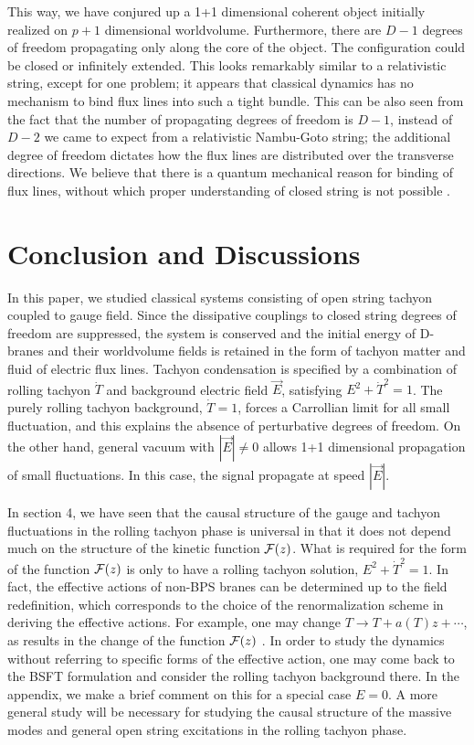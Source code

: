 \documentclass[a4paper,12pt]{article}
\begin{document}
This way, we have conjured up a 1+1 dimensional coherent object
initially realized on $p+1$ dimensional worldvolume. Furthermore,
there are $D-1$ degrees of freedom propagating only along the core 
of the object. The configuration could be closed or infinitely 
extended. This looks remarkably similar to a relativistic string,
except for one problem; it appears that classical dynamics has
no mechanism to bind flux lines into such a tight bundle. This can be
also seen from the fact that the number of propagating degrees of
freedom is  
$D-1$, instead of $D-2$ we came to expect from a relativistic Nambu-Goto 
string; the additional degree of freedom dictates how the flux lines are
distributed over the transverse directions. We believe that there is
a quantum mechanical reason for binding of flux lines, without which
proper understanding of closed string is not possible \cite{yi,conf}.

\section{Conclusion and Discussions} 

In this paper, we studied classical systems consisting of open string
tachyon 
coupled to gauge field. Since the dissipative couplings to
closed string degrees of freedom are suppressed, the system is conserved 
and the initial energy of D-branes and their worldvolume fields is
retained in the form of tachyon matter and fluid of electric flux
lines. Tachyon condensation is specified by a combination of rolling
tachyon $\dot T$ and background electric field $\vec E$, satisfying
$E^2+\dot T^2=1$. The purely rolling tachyon background, $\dot T=1$,
forces a Carrollian limit for all small fluctuation, and this explains
the absence of perturbative degrees of freedom. On the other hand,
general 
vacuum with $|\vec E|\neq 0$ allows 1+1 dimensional propagation of small
fluctuations.  In this case, the signal propagate at speed $|\vec E|$.

In section 4, we have seen that the causal structure of the gauge and
tachyon fluctuations in the rolling tachyon phase is universal in that
it does not depend much on the structure of the kinetic
function ${\cal F}(z)$. What is required for the form of the function 
${\cal F}(z)$ is only to have a rolling tachyon solution, 
$E^2 + \dot{T}^2 =1$. In fact, the effective actions of 
non-BPS branes can be determined up to the field redefinition, which
corresponds to the choice of the renormalization scheme in deriving the
effective actions. For example, one may change 
$T \rightarrow T + a(T) z + \cdots$, as results in the change of the
function ${\cal F}(z)$ \cite{Muk}. 
In order to study the dynamics without 
referring to specific forms of the effective action, one may come back
to the BSFT formulation and consider the rolling tachyon background
there. In the appendix, we make a brief comment on this for a special
case $E=0$. A more general study will be necessary for studying the
causal structure of the massive modes and general open string
excitations in the rolling tachyon phase. 
\end{document}
